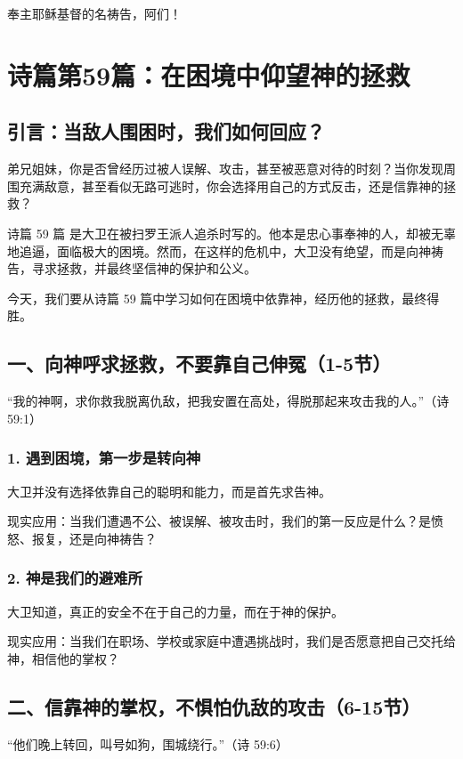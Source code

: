 \documentclass[a4paper, 12pt]{article}
\begin{document}
奉主耶稣基督的名祷告，阿们！
\newpage
\section{诗篇第59篇：在困境中仰望神的拯救}
\subsection*{引言：当敌人围困时，我们如何回应？}
\hspace{0.6cm}弟兄姐妹，你是否曾经历过被人误解、攻击，甚至被恶意对待的时刻？当你发现周围充满敌意，甚至看似无路可逃时，你会选择用自己的方式反击，还是信靠神的拯救？

诗篇 59 篇 是大卫在被扫罗王派人追杀时写的。他本是忠心事奉神的人，却被无辜地追逼，面临极大的困境。然而，在这样的危机中，大卫没有绝望，而是向神祷告，寻求拯救，并最终坚信神的保护和公义。

今天，我们要从诗篇 59 篇中学习如何在困境中依靠神，经历他的拯救，最终得胜。

\subsection*{一、向神呼求拯救，不要靠自己伸冤（1-5节）}
“我的神啊，求你救我脱离仇敌，把我安置在高处，得脱那起来攻击我的人。”（诗 59:1）

\subsubsection*{1. 遇到困境，第一步是转向神}
\hspace{0.6cm}大卫并没有选择依靠自己的聪明和能力，而是首先求告神。

现实应用：当我们遭遇不公、被误解、被攻击时，我们的第一反应是什么？是愤怒、报复，还是向神祷告？
\subsubsection*{2. 神是我们的避难所}
\hspace{0.6cm}大卫知道，真正的安全不在于自己的力量，而在于神的保护。

现实应用：当我们在职场、学校或家庭中遭遇挑战时，我们是否愿意把自己交托给神，相信他的掌权？
\subsection*{二、信靠神的掌权，不惧怕仇敌的攻击（6-15节）}
“他们晚上转回，叫号如狗，围城绕行。”（诗 59:6）
\end{document}
